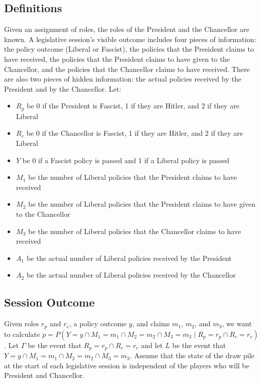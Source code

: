 \documentclass[fleqn, 12pt, letterpaper]{article}
\begin{document}
\subsection{Definitions}
Given an assignment of roles, the roles of the President and the Chancellor are known. A legislative session's visible outcome includes four pieces of information: the policy outcome (Liberal or Fascist), the policies that the President claims to have received, the policies that the President claims to have given to the Chancellor, and the policies that the Chancellor claims to have received. There are also two pieces of hidden information: the actual policies received by the President and by the Chancellor. Let:
\begin{itemize}
	\item $R_p$ be 0 if the President is Fascist, 1 if they are Hitler, and 2 if they are Liberal
	\item $R_c$ be 0 if the Chancellor is Fascist, 1 if they are Hitler, and 2 if they are Liberal
	\item $Y$ be 0 if a Fascist policy is passed and 1 if a Liberal policy is passed
	\item $M_1$ be the number of Liberal policies that the President claims to have received
	\item $M_2$ be the number of Liberal policies that the President claims to have given to the Chancellor
	\item $M_3$ be the number of Liberal policies that the Chancellor claims to have received
	\item $A_1$ be the actual number of Liberal policies received by the President
	\item $A_2$ be the actual number of Liberal policies received by the Chancellor
\end{itemize}

\subsection{Session Outcome}
Given roles $r_p$ and $r_c$, a policy outcome $y$, and claims $m_1$, $m_2$, and $m_3$, we want to calculate $p = P(Y=y \cap M_1=m_1 \cap M_2=m_2 \cap M_3=m_3 \mid R_p=r_p \cap R_c=r_c)$. Let $\Gamma$ be the event that $R_p=r_p \cap R_c=r_c$ and let $L$ be the event that $Y=y \cap M_1=m_1 \cap M_2=m_2 \cap M_3=m_3$. Assume that the state of the draw pile at the start of each legislative session is independent of the players who will be President and Chancellor.
\end{document}
